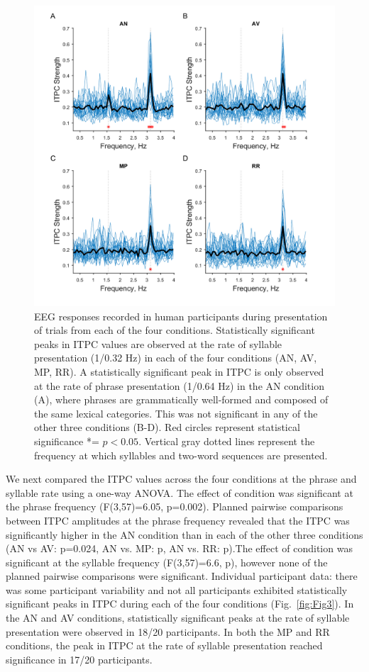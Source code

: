 \documentclass[10pt,letterpaper]{article}
\begin{document}
\begin{figure}[tbhp]
\includegraphics[width=\linewidth]{Grand_average_ITPC_for_all_phrase_conditions.png}
\caption{EEG responses recorded in human participants during presentation of trials from each of the four conditions. Statistically significant peaks in ITPC values are observed at the rate of syllable presentation (1/0.32 Hz) in each of the four conditions (AN, AV, MP, RR). A statistically significant peak in ITPC is only observed at the rate of phrase presentation (1/0.64 Hz) in the AN condition (A), where phrases are grammatically well-formed and composed of the same  lexical categories. This was not significant in any of the other three conditions (B-D). Red circles represent statistical significance *= $p<0.05$. Vertical gray dotted lines represent the frequency at which syllables and two-word sequences are presented.}
\label{fig:Fig2}
\end{figure}
\color{blue}
We next compared the ITPC values across the four conditions at the phrase and syllable rate using a one-way ANOVA. The effect of condition was significant at the phrase frequency (F(3,57)=6.05, p=0.002). Planned pairwise comparisons between ITPC amplitudes at the phrase frequency revealed that the ITPC was significantly higher in the AN condition than in each of the other three conditions (AN vs AV: p=0.024, AN vs. MP: p, AN vs. RR: p).The effect of condition was significant at the syllable frequency (F(3,57)=6.6, p), however none of the planned pairwise comparisons were significant. 
\color{black}
Individual participant data: there was some participant variability and not all participants exhibited statistically significant peaks in ITPC during each of the four conditions (Fig.~\ref{fig:Fig3}). In the AN and AV conditions, statistically significant peaks at the rate of syllable presentation were observed in 18/20 participants. In both the MP and RR conditions, the peak in ITPC at the rate of syllable presentation reached significance in 17/20 participants.
\end{document}
